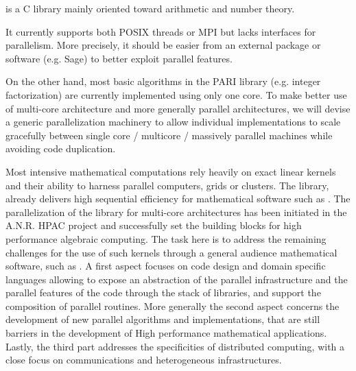 \begin{workpackage}[id=hpc,wphases=36-48,
  title=High Performance Computing,
  PSRM=1, %
  LLRM=12, %
  SARM=1, %
  UKRM=1, %
  UBRM=1, %
  UJFRM=12]
\begin{wpdescription}
\end{wpdescription}
\begin{tasklist}
\begin{task}[title=PARI,id=hpc-pari]
  \Pari is a C library mainly oriented toward arithmetic and number theory.
  
  It currently supports both POSIX threads or MPI but lacks interfaces for
  parallelism. More precisely, it should be easier from an external package
  or software (e.g. Sage) to better exploit \Pari parallel features.

  On the other hand, most basic algorithms in the PARI library (e.g. integer
  factorization) are currently implemented using only one core. To
  make better use of multi-core architecture and more generally parallel
  architectures, we will devise a generic parallelization machinery
  to allow individual implementations to scale gracefully between single
  core / multicore / massively parallel machines while avoiding code
  duplication.
\end{task}

\begin{task}[title=GAP,id=hpc-gap]

\end{task}

\begin{task}[title=Linbox,id=hpc-linbox]
Most intensive mathematical computations rely heavily on exact linear kernels
and their ability to harness parallel computers, grids or clusters. The \Linbox
library, already delivers high sequential efficiency for mathematical software
such as \Sage. The parallelization of the library for multi-core architectures
has been initiated in the A.N.R. HPAC project and successfully set the building
blocks for high performance algebraic computing. 
The task here is to  address the remaining challenges for the use of such
kernels through a general audience mathematical software, such as \Sage.
A first aspect focuses on code design and domain specific languages allowing to
expose an abstraction of the parallel infrastructure and the parallel features
of the code through the stack of libraries, and support the
composition of parallel routines.  More generally the second aspect concerns the
development of new parallel algorithms and implementations, that are still
barriers in the development of High performance mathematical
applications. Lastly, the third part addresses the specificities of  distributed
computing, with a close focus on communications and heterogeneous infrastructures.


\end{task}
\end{tasklist}
\end{workpackage}

